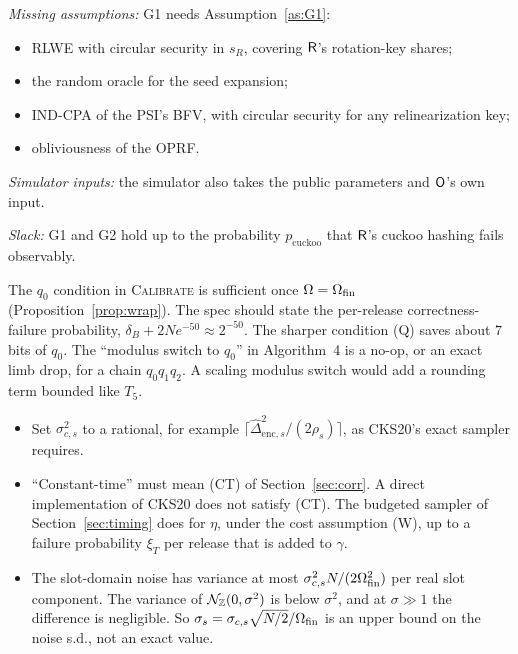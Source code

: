 \begin{correction}\label{cor:G1}
\emph{Missing assumptions:} G1 needs Assumption~\ref{as:G1}:
\begin{itemize}[nosep]
  \item RLWE with circular security in $s_R$, covering $\mathsf{R}$'s rotation-key shares;
  \item the random oracle for the seed expansion;
  \item IND-CPA of the PSI's BFV, with circular security for any relinearization key;
  \item obliviousness of the OPRF.
\end{itemize}
\emph{Simulator inputs:} the simulator also takes the public parameters and $\mathsf{O}$'s own input.

\emph{Slack:} G1 and G2 hold up to the probability $p_{\mathrm{cuckoo}}$ that $\mathsf{R}$'s cuckoo hashing fails observably.
\end{correction}

\begin{correction}[Correctness]\label{cor:wrap}
The $q_0$ condition in \textsc{Calibrate} is sufficient once $\Omega=\Omega_{\mathrm{fin}}$ (Proposition~\ref{prop:wrap}). The spec should state the per-release correctness-failure probability, $\delta_B+2Ne^{-50}\approx2^{-50}$. The sharper condition (Q) saves about $7$ bits of $q_0$. The ``modulus switch to $q_0$'' in Algorithm~4 is a no-op, or an exact limb drop, for a chain $q_0q_1q_2$. A scaling modulus switch would add a rounding term bounded like $T_5$.
\end{correction}

\begin{correction}[Sampler]\label{cor:sampler}
\begin{itemize}[nosep]
  \item Set $\sigma_{c,s}^2$ to a rational, for example $\lceil\widehat\Delta_{\mathrm{enc},s}^2/(2\rho_s)\rceil$, as CKS20's exact sampler requires.
  \item ``Constant-time'' must mean (CT) of Section~\ref{sec:corr}. A direct implementation of CKS20 does not satisfy (CT). The budgeted sampler of Section~\ref{sec:timing} does for $\eta$, under the cost assumption (W), up to a failure probability $\xi_T$ per release that is added to $\gamma$.
  \item The slot-domain noise has variance at most $\sigma_{c,s}^2N/(2\Omega_{\mathrm{fin}}^2)$ per real slot component. The variance of $\mathcal{N}_{\mathbb{Z}}(0,\sigma^2)$ is below $\sigma^2$, and at $\sigma\gg1$ the difference is negligible. So $\sigma_s=\sigma_{c,s}\sqrt{N/2}/\Omega_{\mathrm{fin}}$ is an upper bound on the noise s.d., not an exact value.
\end{itemize}
\end{correction}

